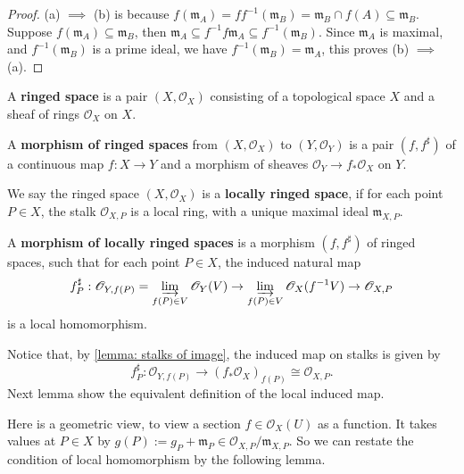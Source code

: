 \documentclass[11pt]{article}
\begin{document}
\begin{proof}
  (a) $ \implies $ (b) is because 
  $f(\mathfrak{m}_{A})= ff^{-1}(\mathfrak{m}_{B})= \mathfrak{m}_{B} \cap f(A) \subseteq \mathfrak{m}_{B} $. 
  Suppose $ f(\mathfrak{m}_{A}) \subseteq \mathfrak{m}_{B} $, 
  then $ \mathfrak{m}_{A} \subseteq f^{-1} f \mathfrak{m}_{A} \subseteq f^{-1}(\mathfrak{m}_{B}) $. 
  Since $ \mathfrak{m}_{A} $ is maximal, and $ f^{-1}(\mathfrak{m}_{B}) $ is a prime ideal, 
  we have $ f^{-1}(\mathfrak{m}_{B}) = \mathfrak{m}_{A} $, this proves (b) $ \implies $ (a).  
\end{proof}



\begin{definition}
  A \textbf{ringed space} is a pair $ (X,\mathscr{O}_{X}) $ 
  consisting of a topological space $ X $ and a sheaf of rings 
  $ \mathscr{O}_{X} $ on $ X $. 

  A \textbf{morphism of ringed spaces} from $ (X,\mathscr{O}_{X}) $ to $ (Y,\mathscr{O}_{Y}) $ 
  is a pair $ (f,f^{\sharp}) $ of a continuous map $ f: X \to Y $ and a morphism of sheaves 
  $ \mathscr{O}_{Y} \to f_{*}\mathscr{O}_{X} $ on $ Y $. 

  We say the ringed space $ (X,\mathscr{O}_{X}) $ is a \textbf{locally ringed space}, 
  if for each point $ P \in X $, the stalk $ \mathscr{O}_{X,P} $ is a local ring, 
  with a unique maximal ideal $ \mathfrak{m}_{X,P} $. 

  A \textbf{morphism of locally ringed spaces} is a morphism $ (f,f^{\sharp}) $ of ringed spaces, 
  such that for each point $ P \in X $, the induced natural map 
  $$f_{P}^{\sharp}: \mathscr{O}_{Y,f(P)} = \varinjlim_{f(P) \in V} \mathscr{O}_{Y}(V) \to 
  \varinjlim_{f(P) \in V} \mathscr{O}_{X}(f^{-1}V) \to \mathscr{O}_{X,P} $$
  is a local homomorphism. 
\end{definition}

Notice that, by \autoref{lemma: stalks of image}, the induced map on stalks 
is given by 
$$ f_{P}^{\sharp}: \mathscr{O}_{Y,f(P)} \to (f_{*}\mathscr{O}_{X})_{f(P)}\cong \mathscr{O}_{X,P}. $$
Next lemma show the equivalent definition of the local induced map. 

Here is a geometric view, to view a section $ f \in \mathscr{O}_{X}(U) $ as a function. 
It takes values at $ P \in X $ by $ g(P):=g_{P} + \mathfrak{m}_{P} \in \mathscr{O}_{X,P}/\mathfrak{m}_{X,P} $. 
So we can restate the condition of local homomorphism by the following lemma. 
\end{document}
